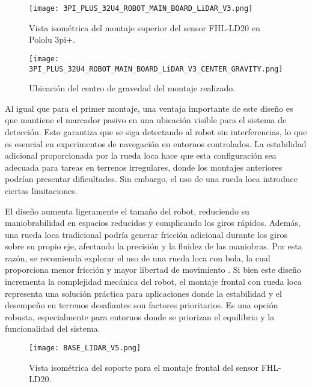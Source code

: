 \begin{figure}[H]
	\centering
	\texttt{[image: 3PI\_PLUS\_32U4\_ROBOT\_MAIN\_BOARD\_LiDAR\_V3.png]}
	\caption{Vista isométrica del montaje superior del sensor FHL-LD20 en Pololu 3pi+.}
	\label{fig:montaje3}
\end{figure}

\begin{figure}[H]
	\centering
	\texttt{[image: 3PI\_PLUS\_32U4\_ROBOT\_MAIN\_BOARD\_LiDAR\_V3\_CENTER\_GRAVITY.png]}
	\caption{Ubicación del centro de gravedad del montaje realizado.}
	\label{fig:centro3}
\end{figure}

Al igual que para el primer montaje, una ventaja importante de este diseño es que mantiene el marcador pasivo en una ubicación visible para el sistema de detección. Esto garantiza que se siga detectando al robot sin interferencias, lo que es esencial en experimentos de navegación en entornos controlados. La estabilidad adicional proporcionada por la rueda loca hace que esta configuración sea adecuada para tareas en terrenos irregulares, donde los montajes anteriores podrían presentar dificultades. Sin embargo, el uso de una rueda loca introduce ciertas limitaciones.

El diseño aumenta ligeramente el tamaño del robot, reduciendo su maniobrabilidad en espacios reducidos y complicando los giros rápidos. Además, una rueda loca tradicional podría generar fricción adicional durante los giros sobre su propio eje, afectando la precisión y la fluidez de las maniobras. Por esta razón, se recomienda explorar el uso de una rueda loca con bola, la cual proporciona menor fricción y mayor libertad de movimiento \cite{caster_wheel}. Si bien este diseño incrementa la complejidad mecánica del robot, el montaje frontal con rueda loca representa una solución práctica para aplicaciones donde la estabilidad y el desempeño en terrenos desafiantes son factores prioritarios. Es una opción robusta, especialmente para entornos donde se priorizan el equilibrio y la funcionalidad del sistema.

\begin{figure}[H]
	\centering
	\texttt{[image: BASE\_LIDAR\_V5.png]}
	\caption{Vista isométrica del soporte para el montaje frontal del sensor FHL-LD20.}
	\label{fig:base3}
\end{figure}

